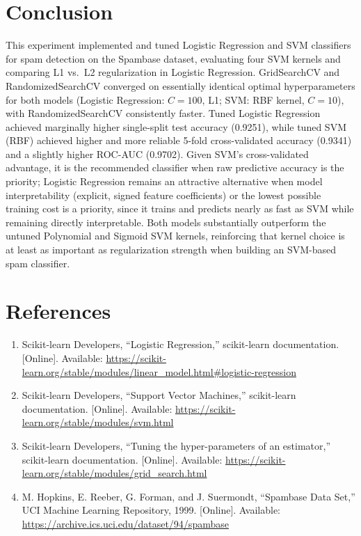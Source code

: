 \documentclass[12pt,a4paper]{article}
\DeclareRobustCommand{\_}{\textunderscore\allowbreak}
\begin{document}
\section{Conclusion}
This experiment implemented and tuned Logistic Regression and SVM
classifiers for spam detection on the Spambase dataset, evaluating four SVM
kernels and comparing L1 vs.\ L2 regularization in Logistic Regression.
GridSearchCV and RandomizedSearchCV converged on essentially identical
optimal hyperparameters for both models (Logistic Regression: $C=100$, L1;
SVM: RBF kernel, $C=10$), with RandomizedSearchCV consistently faster.
Tuned Logistic Regression achieved marginally higher single-split test
accuracy (0.9251), while tuned SVM (RBF) achieved higher and more reliable
5-fold cross-validated accuracy (0.9341) and a slightly higher ROC-AUC
(0.9702). Given SVM's cross-validated advantage, it is the recommended
classifier when raw predictive accuracy is the priority; Logistic
Regression remains an attractive alternative when model interpretability
(explicit, signed feature coefficients) or the lowest possible training
cost is a priority, since it trains and predicts nearly as fast as SVM
while remaining directly interpretable. Both models substantially
outperform the untuned Polynomial and Sigmoid SVM kernels, reinforcing that
kernel choice is at least as important as regularization strength when
building an SVM-based spam classifier.

\section{References}
\begin{enumerate}
\item Scikit-learn Developers, ``Logistic Regression,'' scikit-learn
documentation. [Online]. Available:
\url{https://scikit-learn.org/stable/modules/linear_model.html#logistic-regression}
\item Scikit-learn Developers, ``Support Vector Machines,'' scikit-learn
documentation. [Online]. Available:
\url{https://scikit-learn.org/stable/modules/svm.html}
\item Scikit-learn Developers, ``Tuning the hyper-parameters of an
estimator,'' scikit-learn documentation. [Online]. Available:
\url{https://scikit-learn.org/stable/modules/grid_search.html}
\item M. Hopkins, E. Reeber, G. Forman, and J. Suermondt, ``Spambase Data
Set,'' UCI Machine Learning Repository, 1999. [Online]. Available:
\url{https://archive.ics.uci.edu/dataset/94/spambase}
\end{enumerate}
\end{document}
